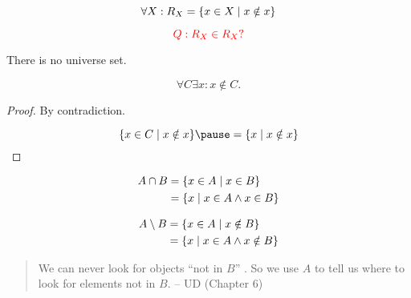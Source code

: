 \begin{frame}{}
  \[
    \forall X: R_X = \{x \in X \mid x \notin x\}
  \]

  \pause
  \[
    \textcolor{red}{Q: R_X \in R_X ?}
  \]

  \pause
  \begin{theorem}
    There is no universe set. 

    \pause
    \[
      \forall C \exists x: x \notin C.
    \]
  \end{theorem}

  \pause
  \begin{proof}
    \centerline{By contradiction.}

    \pause
    \[
      \set{x \in C \mid x \notin x} \pause = \set{x \mid x \notin x}
    \]
  \end{proof}
\end{frame}

\begin{frame}{}
  \begin{definition}[``$\cap$'']
    \vspace{-0.50cm}
    \begin{align*}
      A \cap B &= \{x \in A \mid x \in B\} \\
	       &= \{x \mid x \in A \land x \in B\}
    \end{align*}
  \end{definition}

  \vspace{0.80cm}
  \begin{definition}[``$\setminus$'']
    \vspace{-0.50cm}
    \begin{align*}
      A \setminus B &= \{x \in A \mid x \notin B\} \\
	       &= \{x \mid x \in A \land x \notin B\}
    \end{align*}
  \end{definition}

  \pause
  \vspace{0.30cm}
  \begin{quote}
    We can never look for objects ``not in $B$'' .
    So we use $A$ to tell us where to look for elements not in $B$.
    \hfill -- UD (Chapter 6)
  \end{quote}
\end{frame}


